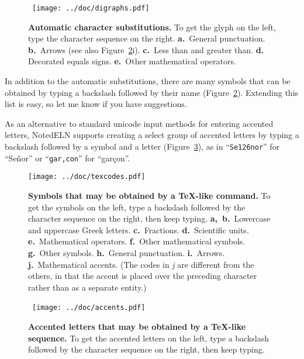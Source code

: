\documentclass[11pt]{report}
\begin{document}
\begin{figure}[t]
\noindent~\hfill\texttt{[image: ../doc/digraphs.pdf]}\hfill~\vspace{-40pt}

\caption{{\bf Automatic character substitutions.} To get the glyph on
  the left, type the character sequence on the right. {\bf a.}~General
  punctuation. {\bf b.}~Arrows (see also Figure~\ref{fig:texcodes}i). {\bf c.}~Less than and greater
  than. {\bf d.} Decorated equals signs. {\bf e.}~Other mathematical
  operators.}\label{fig:charsubst}
\end{figure}

In addition to the automatic substitutions, there are many symbols
that can be obtained by typing a backslash followed by their name
(Figure~\ref{fig:texcodes}).  Extending this list
is easy, so let me know if you have suggestions.

As an alternative to standard unicode input methods for entering
accented letters, NotedELN supports creating a select group of accented
letters by typing a backslash followed by a symbol and a letter
(Figure~\ref{fig:accents}), as in ``{\tt Se\char126nor}'' for
``Se\~nor'' or ``{\tt gar,con}'' for ``gar\c{c}on''. 

\begin{figure}
\noindent\texttt{[image: ../doc/texcodes.pdf]}\vspace{-7pt}

\caption{{\bf Symbols that may be obtained by a TeX-like command.} To
  get the symbols on the left, type a backslash followed by the character sequence on the
  right, then keep typing.
  {\bf a,~b.}~Lowercase and uppercase Greek letters.
  {\bf c.}~Fractions.
  {\bf d.}~Scientific units.
  {\bf e.}~Mathematical operators.
 {\bf f.}~Other mathematical symbols.
  {\bf g.}~Other symbols.
  {\bf h.}~General punctuation.
  {\bf i.}~Arrows.
  {\bf j.}~Mathematical accents.
  (The codes in \emph{j} are
  different from the others, in that the accent is placed over the
  preceding character rather than as a separate
  entity.)}\label{fig:texcodes}
\end{figure}

\begin{figure}
\noindent~\hfill\texttt{[image: ../doc/accents.pdf]}\vspace{-7pt}\hfill~

\caption{{\bf Accented letters that may be obtained by a TeX-like sequence.} To
  get the accented letters on the left, type a backslash followed by the character sequence on the
  right, then keep typing.}\label{fig:accents}
\end{figure}
\end{document}
